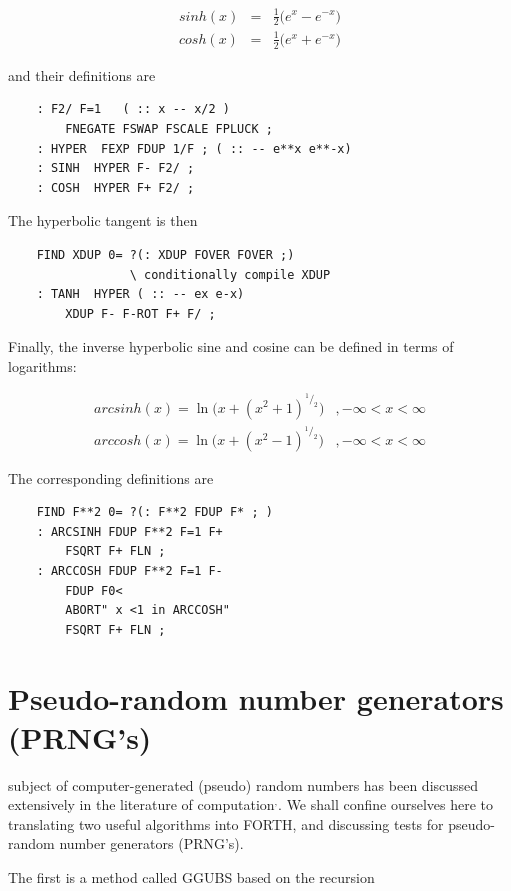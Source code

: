 \begin{eqnarray*}
    sinh(x) & = & \frac{1}{2}\Big(e^x-e^{-x}\Big)\label{hyp_eqn} \\
    cosh(x) & = & \frac{1}{2}\Big(e^x+e^{-x}\Big) 
\end{eqnarray*}

and their definitions are
\begin{lstlisting}
    : F2/ F=1   ( :: x -- x/2 ) 
        FNEGATE FSWAP FSCALE FPLUCK ;
    : HYPER  FEXP FDUP 1/F ; ( :: -- e**x e**-x)
    : SINH  HYPER F- F2/ ;
    : COSH  HYPER F+ F2/ ;
\end{lstlisting}

The hyperbolic tangent is then

\begin{lstlisting}
    FIND XDUP 0= ?(: XDUP FOVER FOVER ;)
                 \ conditionally compile XDUP
    : TANH  HYPER ( :: -- ex e-x)
        XDUP F- F-ROT F+ F/ ;
\end{lstlisting}

Finally, the inverse hyperbolic sine and cosine can be defined in
terms of logarithms:

\begin{eqnarray*}
    arcsinh(x) = \ln{\big(x + (x^2 + 1)^{^1/_2}\big)}  &, -\infty < x < \infty \\
    arccosh(x) = \ln{\big(x + (x^2 - 1)^{^1/_2}\big)}  &, -\infty < x < \infty 
\end{eqnarray*}

The corresponding definitions are 

\begin{lstlisting}
    FIND F**2 0= ?(: F**2 FDUP F* ; )
    : ARCSINH FDUP F**2 F=1 F+
        FSQRT F+ FLN ;
    : ARCCOSH FDUP F**2 F=1 F-
        FDUP F0<
        ABORT" x <1 in ARCCOSH"
        FSQRT F+ FLN ;
\end{lstlisting}

\section{Pseudo-random number generators (PRNG's)}\label{chap:03_05}
subject of computer-generated (pseudo) random numbers has been discussed extensively in the literature of computation$^,$. We shall confine ourselves here to translating two useful algorithms into FORTH, and discussing tests for pseudo-random number generators (PRNG's).

The first is a method called GGUBS  based on the recursion

